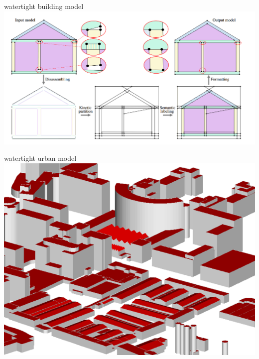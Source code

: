 \documentclass[10pt]{beamer}
\begin{document}
\begin{frame}[plain]{watertight building model}
    \includegraphics[scale = 0.37]{../../images/example_algorithm_2.png}
\end{frame}
\begin{frame}[plain]{watertight urban model}
    \includegraphics[scale = 0.60]{../../images/example_algorithm_3.png}
\end{frame}
\end{document}
